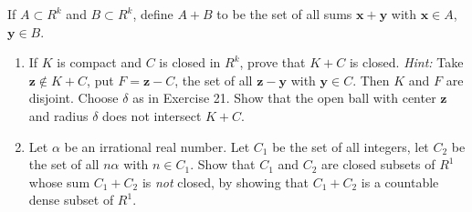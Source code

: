 \documentclass[main.tex]{subfiles}
\begin{document}
If $A \subset R^{k}$ and $B \subset R^{k}$, define $A + B$ to be the set of all sums $\mathbf{x} + \mathbf{y}$ with $\mathbf{x} \in A$, $\mathbf{y} \in B$.
\begin{enumerate}
  \item If $K$ is compact and $C$ is closed in $R^{k}$, prove that $K + C$ is closed. \textit{Hint:} Take $\mathbf{z} \notin K + C$, put $F = \mathbf{z} - C$, the set of all $\mathbf{z} - \mathbf{y}$ with $\mathbf{y} \in C$. Then $K$ and $F$ are disjoint. Choose $\delta$ as in Exercise 21. Show that the open ball with center $\mathbf{z}$ and radius $\delta$ does not intersect $K + C$.
  \item Let $\alpha$ be an irrational real number. Let $C_{1}$ be the set of all integers, let $C_{2}$ be the set of all $n\alpha$ with $n \in C_{1}$. Show that $C_{1}$ and $C_{2}$ are closed subsets of $R^{1}$ whose sum $C_{1} + C_{2}$ is \textit{not} closed, by showing that $C_{1} + C_{2}$ is a countable dense subset of $R^{1}$.
\end{enumerate}
\end{document}

